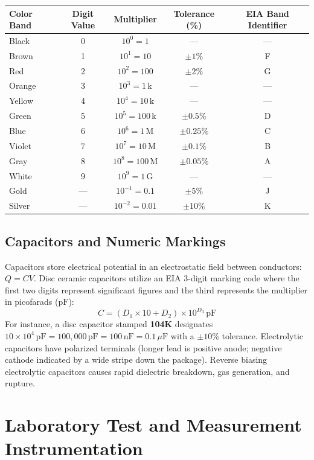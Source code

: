 \begin{center}
\begin{tabular}{lcccc}
\toprule
\textbf{Color Band} & \textbf{Digit Value} & \textbf{Multiplier} & \textbf{Tolerance (\%)} & \textbf{EIA Band Identifier} \\
\midrule
Black & 0 & $10^0 = 1$ & --- & --- \\
Brown & 1 & $10^1 = 10$ & $\pm 1\%$ & F \\
Red & 2 & $10^2 = 100$ & $\pm 2\%$ & G \\
Orange & 3 & $10^3 = 1\,\mathrm{k}$ & --- & --- \\
Yellow & 4 & $10^4 = 10\,\mathrm{k}$ & --- & --- \\
Green & 5 & $10^5 = 100\,\mathrm{k}$ & $\pm 0.5\%$ & D \\
Blue & 6 & $10^6 = 1\,\mathrm{M}$ & $\pm 0.25\%$ & C \\
Violet & 7 & $10^7 = 10\,\mathrm{M}$ & $\pm 0.1\%$ & B \\
Gray & 8 & $10^8 = 100\,\mathrm{M}$ & $\pm 0.05\%$ & A \\
White & 9 & $10^9 = 1\,\mathrm{G}$ & --- & --- \\
Gold & --- & $10^{-1} = 0.1$ & $\pm 5\%$ & J \\
Silver & --- & $10^{-2} = 0.01$ & $\pm 10\%$ & K \\
\bottomrule
\end{tabular}
\end{center}

\subsection{Capacitors and Numeric Markings}
Capacitors store electrical potential in an electrostatic field between conductors: $Q = C V$.
Disc ceramic capacitors utilize an EIA 3-digit marking code where the first two digits represent significant figures and the third represents the multiplier in picofarads ($\mathrm{pF}$):
\[ C = (D_1 \times 10 + D_2) \times 10^{D_3}\,\mathrm{pF} \]
For instance, a disc capacitor stamped \textbf{104K} designates $10 \times 10^4\,\mathrm{pF} = 100{,}000\,\mathrm{pF} = 100\,\mathrm{nF} = 0.1\,\mu\mathrm{F}$ with a $\pm 10\%$ tolerance.
Electrolytic capacitors have polarized terminals (longer lead is positive anode; negative cathode indicated by a wide stripe down the package). Reverse biasing electrolytic capacitors causes rapid dielectric breakdown, gas generation, and rupture.

\section{Laboratory Test and Measurement Instrumentation}
